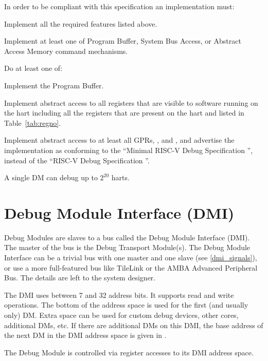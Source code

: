 \begin{steps}{In order to be compliant with this specification an
    implementation must:}
\item Implement all the required features listed above.
\item Implement at least one of Program Buffer, System Bus Access, or Abstract
    Access Memory command mechanisms.
\item
    \begin{steps}{Do at least one of:}
        \item Implement the Program Buffer.
        \item Implement abstract access to all registers that are visible to
            software running on the hart including all the registers that are
            present on the hart and listed in Table~\ref{tab:regno}.
        \item Implement abstract access to at least all GPRs, \RcsrDcsr, and
            \RcsrDpc, and advertise the implementation as conforming to the
            ``Minimal RISC-V Debug Specification \versionnum'', instead of the
            ``RISC-V Debug Specification \versionnum''.
    \end{steps}
\end{steps}

A single DM can debug up to $2^{20}$ harts.

\section{Debug Module Interface (DMI)} \label{dmi}

Debug Modules are slaves to a bus called the Debug Module Interface (DMI). The
master of the bus is the Debug Transport Module(s).
The Debug Module Interface can be a trivial bus with one master and one slave (see \ref{dmi_signals}),
or use a more full-featured bus like TileLink or the AMBA Advanced Peripheral
Bus. The details are left to the system designer.

The DMI uses between 7 and 32 address bits.  It supports read and write
operations.  The bottom of the address space is
used for the first (and usually only) DM. Extra space can be used for custom
debug devices, other cores, additional DMs, etc. If there are additional DMs
on this DMI, the base address of the next DM in the DMI address space is given
in \RdmNextdm.

The Debug Module is controlled via register accesses to its DMI address space.

